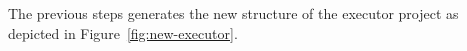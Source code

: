 The previous steps generates the new structure of the executor project as depicted in Figure~\ref{fig:new-executor}.

